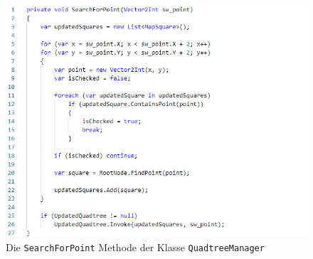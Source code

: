 \documentclass[a4paper,12pt]{article}
\newcommand{\code}{\texttt}
\begin{document}
\begin{figure}[H]
    \centering
    \includegraphics[width=1\linewidth]{Bilder/Aufgabe3/Quadtree_01.png}
    \caption{Die \code{SearchForPoint} Methode der Klasse \code{QuadtreeManager}}
\end{figure}
\end{document}
